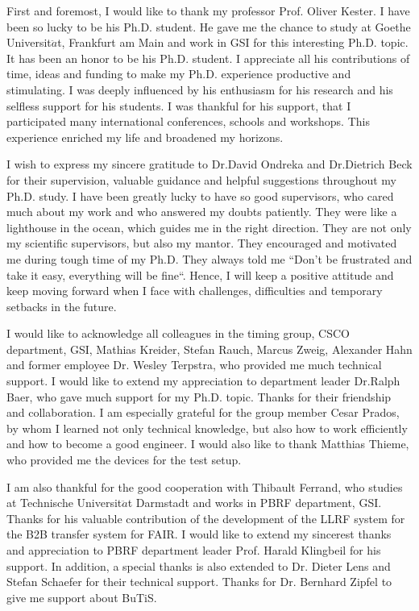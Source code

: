 First and foremost, I would like to thank my professor Prof. Oliver Kester. I have been so lucky to be his Ph.D. student. He gave me the chance to study at Goethe Universit$\ddot{a}$t, Frankfurt am Main and work in GSI for this interesting Ph.D. topic. It has been an honor to be his Ph.D. student. I appreciate all his contributions of time, ideas and funding to make my Ph.D. experience productive and stimulating. I was deeply influenced by his enthusiasm for his research and his selfless support for his students. I was thankful for his support, that I participated many international conferences, schools and workshops. This experience enriched my life and  
broadened my horizons.

I wish to express my sincere gratitude to Dr.David Ondreka and Dr.Dietrich Beck for their supervision, valuable guidance and helpful suggestions throughout my Ph.D. study. I have been greatly lucky to have so good supervisors, who cared much about my work and who answered my doubts patiently. They were like a lighthouse in the ocean, which guides me in the right direction. They are not only my  scientific supervisors, but also my mantor. They encouraged and motivated me during tough time of my Ph.D. They always told me ``Don't be frustrated and take it easy, everything will be fine``. Hence, I will  keep a positive attitude and keep moving forward when I face with challenges, difficulties and temporary setbacks in the future.

I would like to acknowledge all colleagues in the timing group, CSCO department, GSI, Mathias Kreider, Stefan Rauch, Marcus Zweig, Alexander Hahn and former employee Dr. Wesley Terpstra, who provided me much technical support. I would like to extend my appreciation to department leader Dr.Ralph Baer, who gave much support for my Ph.D. topic. Thanks for their friendship and collaboration. I am especially grateful for the group member Cesar Prados, by whom I learned not only technical knowledge, but also how to work efficiently and how to become a good engineer. I would also like to thank Matthias Thieme, who provided me the devices for the test setup.  

I am also thankful for the good cooperation with Thibault Ferrand, who studies at Technische Universit$\ddot{a}$t Darmstadt and works in \gls{PBRF} department, GSI. Thanks for his valuable contribution of the development of the LLRF system for the B2B transfer system for FAIR. I would like to extend my sincerest thanks and appreciation to PBRF department leader Prof. Harald Klingbeil for his support. In addition, a special thanks is also extended to Dr. Dieter Lens and Stefan Schaefer for their technical support. Thanks for Dr. Bernhard Zipfel to give me support about BuTiS.

